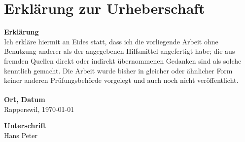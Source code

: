 \section{Erklärung zur Urheberschaft}
\vspace{0.8cm}
\textbf{Erklärung}\\

Ich erkläre hiermit an Eides statt, dass ich die vorliegende Arbeit ohne Benutzung anderer als der angegebenen Hilfsmittel angefertigt habe; die aus fremden Quellen direkt oder indirekt übernommenen Gedanken sind als solche kenntlich gemacht. Die Arbeit wurde bisher in gleicher oder ähnlicher Form keiner anderen Prüfungsbehörde vorgelegt und auch noch nicht veröffentlicht.\\
\vspace{0.8cm}\\

\textbf{Ort, Datum}\\
\vspace{0.2cm}
Rapperswil, \today\\
\vspace{0.8cm}

\textbf{Unterschrift}\\
\vspace{0.2cm}
Hans \hspace{3cm} Peter

\clearpage

